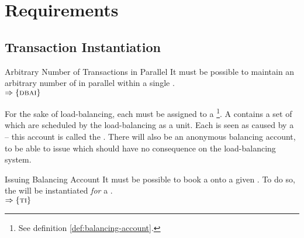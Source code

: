 \documentclass[a4paper, 12pt]{book}
\newcommand{\INTERFACE}[1]{$\Rightarrow\left\{#1\right\}$}
\begin{document}
\section{Requirements}


\subsection{Transaction Instantiation}

\begin{requirement*}{Arbitrary Number of Transactions in Parallel}
  It must be possible to maintain an arbitrary number of 
  in parallel within a single .\\
  \INTERFACE{\DBAI}
\end{requirement*}


For the sake of load-balancing, each  must be assigned
to a \footnote{See definition \vref{def:balancing-account}.}.
A  contains a set of  which are scheduled
by the load-balancing as a unit. Each  is seen as caused by a
 -- this account is called the .
%
There will also be an anonymous balancing account, to be able to issue
 which should have no consequence on the load-balancing
system.
\begin{requirement*}{Issuing Balancing Account}
  It must be possible to book a  onto a given . To do so, the  will be instantiated
  \emph{for} a .\\
  \INTERFACE{\TRANSACTION}
\end{requirement*}
\end{document}
